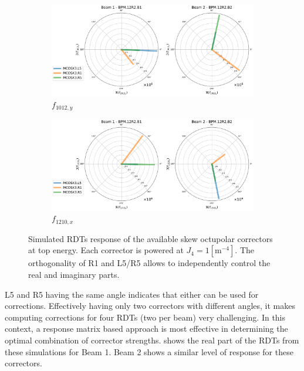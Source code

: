 \begin{figure}[!htb]
    \centering
    \begin{subfigure}{0.7\textwidth}
        \includegraphics[width=\textwidth]{./images/orthogonal_a4_inj_f1012_y.pdf}
        \caption{$f_{1012,y}$}
    \end{subfigure}
    \par\bigskip 
    \begin{subfigure}{0.7\textwidth}
        \includegraphics[width=\textwidth]{./images/orthogonal_a4_inj_f1210_x.pdf}
        \caption{$f_{1210,x}$}
    \end{subfigure}
    \caption{Simulated RDTs response of the available skew octupolar correctors at top energy.  Each
    corrector is powered at $J_4 = 1 [\text{m}^{-4}]$. The orthogonality of R1 and L5/R5 allows to
    independently control the real and imaginary parts.}
    \label{fig:skew_octupolar:response_correctors_polar}
\end{figure}

L5 and R5 having the same angle indicates that either can be used for corrections. Effectively
having only two correctors with different angles, it makes computing corrections for four RDTs (two
per beam) very challenging.  In this context, a response matrix based approach is most effective in
determining the optimal combination of corrector strengths.
 shows the real part of the RDTs from these
simulations for Beam 1. Beam 2 shows a similar level of response for these correctors.


